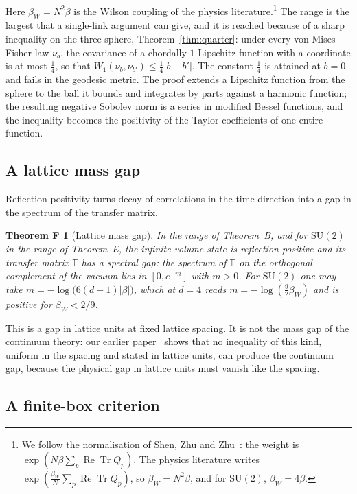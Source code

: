 \documentclass[aps,prd,twocolumn,superscriptaddress,nofootinbib,longbibliography,floatfix,amsmath,amssymb,10pt]{revtex4-2}
\newtheorem*{theoremF}{Theorem F}
\theoremstyle{definition}
\theoremstyle{remark}
\newcommand{\SU}{\mathrm{SU}}
\newcommand{\ReTr}{\operatorname{Re}\operatorname{Tr}}
\begin{document}
Here $\beta_W=N^2\beta$ is the Wilson coupling of the physics
literature.\footnote{We follow the normalisation of Shen, Zhu and Zhu~\cite{SZZ23}:
the weight is $\exp(N\beta\sum_p\ReTr Q_p)$. The physics literature writes
$\exp(\frac{\beta_W}N\sum_p\ReTr Q_p)$, so $\beta_W=N^2\beta$, and for
$\SU(2)$, $\beta_W=4\beta$.} The range is the largest that a single-link
argument can give, and it is reached because of a sharp inequality on the
three-sphere, Theorem~\ref{thm:quarter}: under every von Mises--Fisher law
$\nu_b$, the covariance of a chordally $1$-Lipschitz function with a
coordinate is at most $\frac14$, so that $W_1(\nu_b,\nu_{b'})\le\frac14
|b-b'|$. The constant $\frac14$ is attained at $b=0$ and fails in the geodesic
metric. The proof extends a Lipschitz function from the sphere to the ball
it bounds and integrates by parts against a harmonic function; the
resulting negative Sobolev norm is a series in modified Bessel functions,
and the inequality becomes the positivity of the Taylor coefficients of one
entire function.

\subsection{A lattice mass gap}

Reflection positivity turns decay of correlations in the time direction into
a gap in the spectrum of the transfer matrix.

\begin{theoremF}[Lattice mass gap]
In the range of Theorem~B, and for $\SU(2)$ in the range of Theorem~E, the
infinite-volume state is reflection positive and its transfer matrix
$\mathbb T$ has a spectral gap: the spectrum of $\mathbb T$ on the
orthogonal complement of the vacuum lies in $[0,e^{-m}]$ with $m>0$. For
$\SU(2)$ one may take $m=-\log\bigl(6(d-1)|\beta|\bigr)$, which at $d=4$
reads $m=-\log(\frac92\beta_W)$ and is positive for $\beta_W<2/9$.
\end{theoremF}

This is a gap in lattice units at fixed lattice spacing. It is not the mass
gap of the continuum theory: our earlier paper~\cite{BB26} shows that no
inequality of this kind, uniform in the spacing and stated in lattice units,
can produce the continuum gap, because the physical gap in lattice units
must vanish like the spacing.

\subsection{A finite-box criterion}
\end{document}
